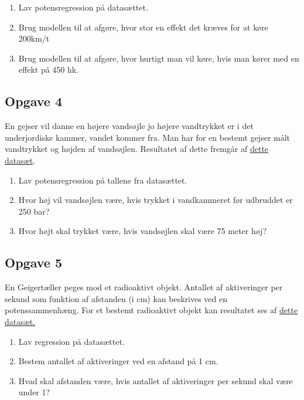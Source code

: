 \begin{enumerate}[label=\roman*)]
	\item Lav potensregression på datasættet.
	\item Brug modellen til at afgøre, hvor stor en effekt det kræves for at køre 200km/t
	\item Brug modellen til at afgøre, hvor hurtigt man vil køre, hvis man kører med en effekt 
	på 450 hk.
\end{enumerate}

\subsection*{Opgave 4}

En gejser vil danne en højere vandsøjle jo højere vandtrykket er i det underjordiske kammer, vandet kommer fra. Man har for en bestemt gejser målt vandtrykket og højden af vandsøjlen. Resultatet af dette fremgår af \href{https://github.com/ChristianJLex/TeachingNotes/raw/master/2023-2024/Data og lign/Gejser.xlsx}{\color{blue!60} dette datasæt}.

\begin{enumerate}[label=\roman*)]
	\item Lav potensregression på tallene fra datasættet.
	\item Hvor høj vil vandsøjlen være, hvis trykket i vandkammeret før udbruddet er 250 bar?
	\item Hvor højt skal trykket være, hvis vandsøjlen skal være 75 meter høj?
\end{enumerate}

\subsection*{Opgave 5}

En Geigertæller peges mod et radioaktivt objekt. Antallet af aktiveringer per sekund som funktion af afstanden (i cm) kan beskrives ved en potenssammenhæng. For et bestemt radioaktivt objekt kan resultatet ses af \href{https://github.com/ChristianJLex/TeachingNotes/raw/master/2023-2024/Data%20og%20lign/Geiger.xlsx}{\color{blue!60} dette datasæt.}

\begin{enumerate}[label=\roman*)]
	\item Lav regression på datasættet.
	\item Bestem antallet af aktiveringer ved en afstand på 1 cm. 
	\item Hvad skal afstanden være, hvis antallet af aktiveringer per sekund skal være under 1?
\end{enumerate}